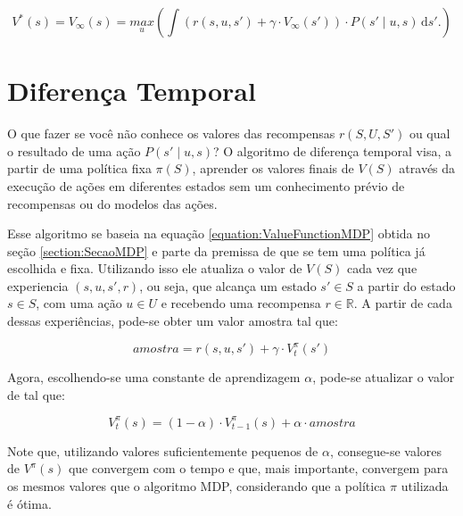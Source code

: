 \begin{equation} \label{equation:ValueFunctionMDP}
    V^* \left( s \right) = V_\infty \left( s \right) = \underset{u}{max} \left( \int \! \left( r \left( s, u, s' \right) + \gamma \cdot V_\infty \left( s' \right) \right) \cdot P \left( s' \mid u, s \right) \, \mathrm{d}s'. \right)
\end{equation}


\section{Diferença Temporal}

O que fazer se você não conhece os valores das recompensas $ r \left( S, U, S' \right) $ ou qual o resultado de uma ação $ P \left( s' \mid u, s \right) $? O algoritmo de diferença temporal visa, a partir de uma política fixa $ \pi \left( S \right) $, aprender os valores finais de $ V \left( S \right) $ através da execução de ações em diferentes estados sem um conhecimento prévio de recompensas ou do modelos das ações.

Esse algoritmo se baseia na equação \ref{equation:ValueFunctionMDP} obtida no seção \ref{section:SecaoMDP} e parte da premissa de que se tem uma política já escolhida e fixa. Utilizando isso ele atualiza o valor de $ V \left( S \right) $ cada vez que experiencia $ \left( s, u, s', r \right) $, ou seja, que alcança um estado $ s' \in S $ a partir do estado $ s \in S $, com uma ação $ u \in U $ e recebendo uma recompensa $ r \in \mathbb{R} $. A partir de cada dessas experiências, pode-se obter um valor amostra tal que:

\begin{equation} \label{equation:AmostraTD}
	amostra = r \left( s, u, s' \right) + \gamma \cdot V_t^\pi \left( s' \right)
\end{equation}

Agora, escolhendo-se uma constante de aprendizagem $ \alpha $, pode-se atualizar o valor de  tal que:

\begin{equation} \label{equation:UpdateValueFunctionTD}
	V_t^\pi \left( s \right) = \left( 1 - \alpha \right) \cdot V_{t-1}^\pi \left( s \right) + \alpha \cdot amostra
\end{equation}

Note que, utilizando valores suficientemente pequenos de $ \alpha $, consegue-se valores de $ V^\pi \left( s \right) $ que convergem com o tempo e que, mais importante, convergem para os mesmos valores que o algoritmo MDP, considerando que a política $ \pi $ utilizada é ótima.

